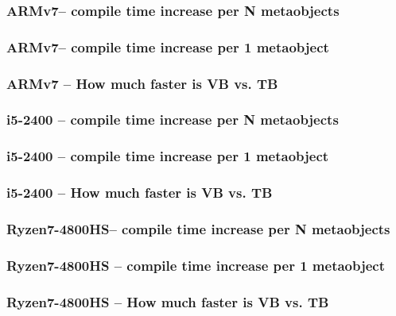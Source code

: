 \documentclass[compress,table,xcolor=table]{beamer}
\begin{document}
\begin{frame}
  \frametitle{ARMv7-- compile time increase per N metaobjects}
\end{frame}
\begin{frame}
  \frametitle{ARMv7-- compile time increase per 1 metaobject}
\end{frame}
\begin{frame}
  \frametitle{ARMv7 -- How much faster is VB vs. TB}
\end{frame}
\begin{frame}
  \frametitle{i5-2400 -- compile time increase per N metaobjects}
\end{frame}
\begin{frame}
  \frametitle{i5-2400 -- compile time increase per 1 metaobject}
\end{frame}
\begin{frame}
  \frametitle{i5-2400 -- How much faster is VB vs. TB}
\end{frame}
\begin{frame}
  \frametitle{Ryzen7-4800HS-- compile time increase per N metaobjects}
\end{frame}
\begin{frame}
  \frametitle{Ryzen7-4800HS -- compile time increase per 1 metaobject}
\end{frame}
\begin{frame}
  \frametitle{Ryzen7-4800HS -- How much faster is VB vs. TB}
\end{frame}
\end{document}
